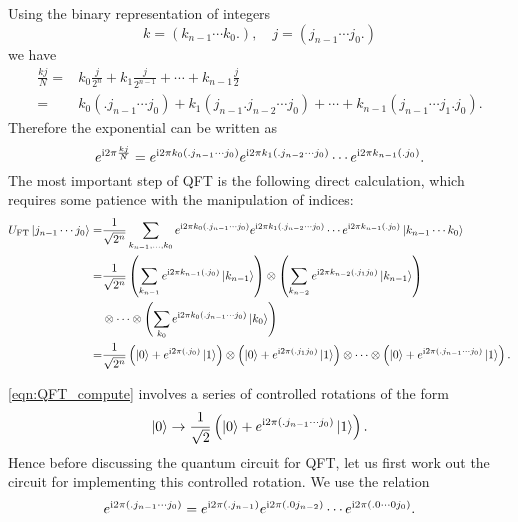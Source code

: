Using the binary representation of integers 
\begin{equation}
k=(k_{n-1}\cdots k_0.), \quad j=(j_{n-1}\cdots j_0.)
\end{equation}
we have
\begin{displaymath}
\begin{split}
\frac{kj}{N}=&k_0\frac{j}{2^{n}}+k_1\frac{j}{2^{n-1}}+\cdots+k_{n-1}\frac{j}{2}\\
=&k_0(.j_{n-1}\cdots j_0)+k_1(j_{n-1}.j_{n-2}\cdots j_0)+\cdots+k_{n-1}(j_{n-1}\cdots j_1.j_0).
\end{split}
\end{displaymath}
Therefore the  exponential can be written as
\begin{equation} 
e^{\mathrm{i} 2\pi\frac{kj}{N}}=e^{\mathrm{i} 2\pi k_0(.j_{n-1}\cdots j_0)} e^{\mathrm{i} 2\pi k_1(.j_{n-2}\cdots j_0)}\cdots e^{\mathrm{i} 2\pi k_{n-1}(.j_0)}.
\end{equation}
The most important step of QFT is the following direct calculation, which requires some patience with the manipulation of indices:
\begin{equation}
\begin{split}
U_{\mathrm{FT}}\ket{j_{n-1}\cdots j_0}=&\frac{1}{\sqrt{2^n}}\sum_{k_{n-1},\ldots,k_0} e^{\mathrm{i} 2\pi k_0(.j_{n-1}\cdots j_0)} e^{\mathrm{i} 2\pi k_1(.j_{n-2}\cdots j_0)}\cdots e^{\mathrm{i} 2\pi k_{n-1}(.j_0)}\ket{k_{n-1}\cdots k_0}\\
=&\frac{1}{\sqrt{2^n}} \left(\sum_{k_{n-1}}e^{\mathrm{i} 2\pi k_{n-1}(.j_0)}\ket{k_{n-1}}\right)\otimes
 \left(\sum_{k_{n-2}}e^{\mathrm{i} 2\pi k_{n-2}(.j_1j_0)}\ket{k_{n-1}}\right)\\
 &\otimes\cdots\otimes \left(\sum_{k_{0}}e^{\mathrm{i} 2\pi k_0(.j_{n-1}\cdots j_0)}\ket{k_{0}}\right)\\
=&\frac{1}{\sqrt{2^n}} \left(\ket{0}+e^{\mathrm{i} 2\pi (.j_0)}\ket{1}\right)\otimes
 \left(\ket{0}+e^{\mathrm{i} 2\pi (.j_1j_0)}\ket{1}\right)\otimes\cdots\otimes \left(\ket{0}+e^{\mathrm{i} 2\pi (.j_{n-1}\cdots j_0)}\ket{1}\right).
\end{split}
\label{eqn:QFT_compute}
\end{equation}


\cref{eqn:QFT_compute} involves a series of controlled rotations of the form \begin{equation}
\ket{0}\to \frac{1}{\sqrt{2}}\left(\ket{0}+e^{\mathrm{i} 2\pi (.j_{n-1}\cdots j_0)}\ket{1}\right).
\end{equation}
Hence before discussing the quantum circuit for QFT, let us first work out the circuit for implementing this controlled rotation. 
We use the relation 
\begin{equation}
e^{\mathrm{i} 2\pi(.j_{n-1}\cdots j_0)}=
e^{\mathrm{i} 2\pi(.j_{n-1})}e^{\mathrm{i} 2\pi(.0j_{n-2})}\cdots e^{\mathrm{i} 2\pi(.0\cdots 0 j_0)}.
\end{equation}




